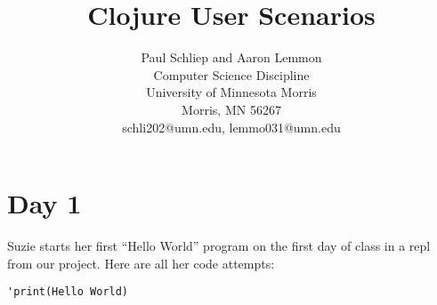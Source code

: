 \documentclass[12pt]{article}
\newcommand{\comment}[1]{}
\begin{document}
\pagestyle{plain}
%

\title{Clojure User Scenarios}
%
%

\author{
Paul Schliep and Aaron Lemmon \\
Computer Science Discipline \\
University of Minnesota Morris\\
Morris, MN 56267\\
schli202@umn.edu, lemmo031@umn.edu
}

\date{}

\maketitle
\thispagestyle{empty}




\newpage
\setcounter{page}{1}

\section{Day 1}
Suzie starts her first “Hello World” program on the first day of class in a repl from our project. Here are all her code attempts:

\verb|'print(Hello World)|
\end{document}
